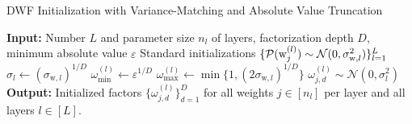 \begin{algorithm}
\small
\caption{\small DWF Initialization with Variance-Matching and Absolute Value Truncation}
\begin{algorithmic}[1]
\label{alg:init}
\STATE \textbf{Input:} 
\STATE \quad Number $L$ and parameter size $n_l$ of layers, factorization depth $D$, minimum absolute value $\varepsilon$
\STATE \quad Standard initializations $\{\mathcal{P}(\mathrm{w}_j^{(l)}) \sim \mathcal{N}(0,\sigma_{\mathrm{w},l}^2)\}_{l=1}^L$
    \STATE $\sigma_l \leftarrow (\sigma_{\mathrm{w},l})^{1/D}$
    \STATE $\omega_{\text{min}}^{(l)} \leftarrow \varepsilon^{1/D}$
    \STATE $\omega_{\text{max}}^{(l)} \leftarrow \min\big\{1,(2\sigma_{\mathrm{w},l})^{1/D}\big\}$
            \REPEAT
                \STATE $\omega_{j,d}^{(l)} \sim \mathcal{N}(0, \sigma_l^2)$
        \ENDFOR
    \ENDFOR
\ENDFOR
\STATE \textbf{Output:} 
\STATE \quad Initialized factors $\{\omega_{j,d}^{(l)}\}_{d=1}^{D}$ for all weights $j \in [n_l]$ per layer and all layers $l\in [L]$.
\end{algorithmic}
\end{algorithm}